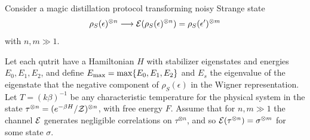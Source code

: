 \begin{theorem}\label{thm:free-energy}
	Consider a magic distillation protocol transforming noisy Strange state
	\begin{equation*}
		\rho_S(\epsilon)^{\otimes n} \longrightarrow {\mathcal E}(\rho_S(\epsilon)^{\otimes n})=\rho_S(\epsilon')^{\otimes m} 
	\end{equation*}
	with $n, m \gg 1$.

Let each qutrit have a Hamiltonian $H$ with stabilizer eigenstates and energies $E_0, E_1, E_2$, and define $E_{\rm max} = \max\{E_0, E_1, E_2\}$ and $E_s$ the eigenvalue of the eigenstate that  the negative component of $\rho_S(\epsilon)$ in the Wigner representation. Let $T =(k\beta)^{-1}$ be any characteristic temperature for the physical system in the state $\tau^{\otimes n}= (e^{-\beta H}/\mathcal{Z})^{\otimes n}$, with free energy $F$. Assume that for $n,m \gg 1$ the channel ${\mathcal E}$ generates negligible correlations on $\tau^{\otimes n}$, and so ${\mathcal E}(\tau^{\otimes n}) = \sigma^{\otimes m}$ for some state $\sigma$.


\end{theorem}
